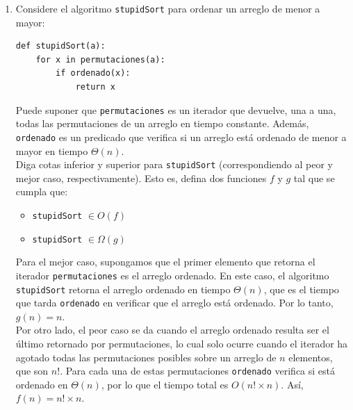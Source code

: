 \documentclass[letterpaper, 12pt]{article}
\begin{document}
\begin{enumerate}


\item Considere el algoritmo \texttt{stupidSort} para ordenar un arreglo de menor a
mayor: \\

\begin{verbatim}
def stupidSort(a):
    for x in permutaciones(a):
        if ordenado(x):
            return x
\end{verbatim}

Puede suponer que \texttt{permutaciones} es un iterador que devuelve, una a una, todas las permutaciones de un arreglo en tiempo constante. Además, \texttt{ordenado} es un predicado que verifica si un arreglo está ordenado de menor a mayor en tiempo $\Theta(n)$. \\

Diga cotas inferior y superior para \texttt{stupidSort} (correspondiendo al peor y mejor caso, respectivamente). Esto es, defina dos funciones $f$ y $g$ tal que se cumpla que: \\

\begin{multicols}{2}
    \begin{itemize}
        \item \texttt{stupidSort} $\in O(f)$
        \item \texttt{stupidSort} $\in \Omega(g)$
    \end{itemize}
\end{multicols}

Para el mejor caso, supongamos que el primer elemento que retorna el iterador \texttt{permutaciones} es el arreglo ordenado. En este caso, el algoritmo \texttt{stupidSort} retorna el arreglo ordenado en tiempo $\Theta(n)$, que es el tiempo que tarda \texttt{ordenado} en verificar que el arreglo está ordenado. Por lo tanto, $g(n) = n$. \\

Por otro lado, el peor caso se da cuando el arreglo ordenado resulta ser el último retornado por {permutaciones}, lo cual solo ocurre cuando el iterador ha agotado todas las permutaciones posibles sobre un arreglo de $n$ elementos, que son $n!$. Para cada una de estas permutaciones \texttt{ordenado} verifica si está ordenado en $\Theta(n)$, por lo que el tiempo total es $O(n! \times n)$. Así, $f(n) = n! \times n$. \\


\end{enumerate}
\end{document}
